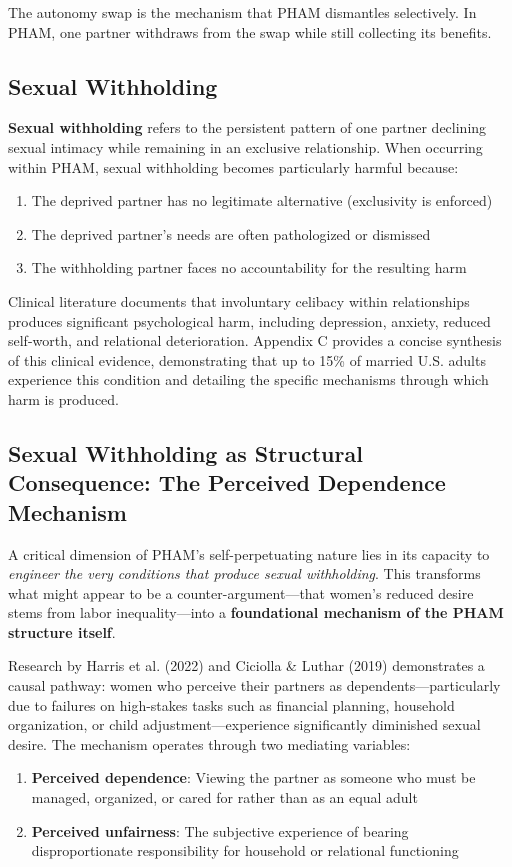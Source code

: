 \documentclass[12pt, letterpaper]{article}
\begin{document}
The autonomy swap is the mechanism that PHAM dismantles selectively. In PHAM, one partner withdraws from the swap while still collecting its benefits.

\subsection{Sexual Withholding}

\textbf{Sexual withholding} refers to the persistent pattern of one partner declining sexual intimacy while remaining in an exclusive relationship. When occurring within PHAM, sexual withholding becomes particularly harmful because:

\begin{enumerate}[label=(\alph*)]
    \item The deprived partner has no legitimate alternative (exclusivity is enforced)
    \item The deprived partner's needs are often pathologized or dismissed
    \item The withholding partner faces no accountability for the resulting harm
\end{enumerate}

Clinical literature documents that involuntary celibacy within relationships produces significant psychological harm, including depression, anxiety, reduced self-worth, and relational deterioration. Appendix C provides a concise synthesis of this clinical evidence, demonstrating that up to 15\% of married U.S. adults experience this condition and detailing the specific mechanisms through which harm is produced.

\subsection{Sexual Withholding as Structural Consequence: The Perceived Dependence Mechanism}

A critical dimension of PHAM's self-perpetuating nature lies in its capacity to \textit{engineer the very conditions that produce sexual withholding}. This transforms what might appear to be a counter-argument---that women's reduced desire stems from labor inequality---into a \textbf{foundational mechanism of the PHAM structure itself}.

Research by Harris et al. (2022) and Ciciolla \& Luthar (2019) demonstrates a causal pathway: women who perceive their partners as dependents---particularly due to failures on high-stakes tasks such as financial planning, household organization, or child adjustment---experience significantly diminished sexual desire. The mechanism operates through two mediating variables:
\begin{enumerate}
    \item \textbf{Perceived dependence}: Viewing the partner as someone who must be managed, organized, or cared for rather than as an equal adult
    \item \textbf{Perceived unfairness}: The subjective experience of bearing disproportionate responsibility for household or relational functioning
\end{enumerate}
\end{document}
